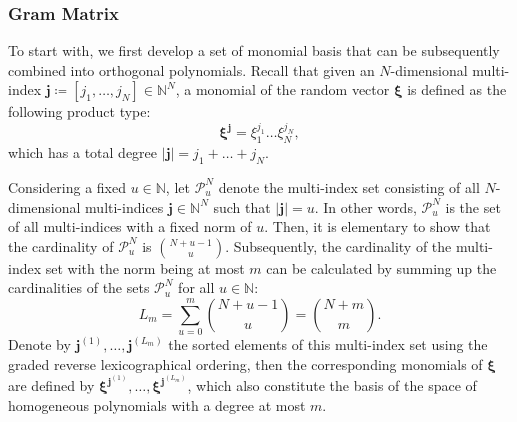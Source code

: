 \documentclass[journal]{IEEEtran}
\theoremstyle{definition}
\theoremstyle{remark}
\begin{document}
\subsubsection{Gram Matrix}
To start with, we first develop a set of monomial basis that can be subsequently combined into orthogonal polynomials.
Recall that given an $N$-dimensional multi-index $\boldsymbol{j}\coloneqq[j_1,\dots,j_N]\in\mathbb{N}^N$, a monomial of the random vector $\boldsymbol{\xi}$ is defined as the following product type:
\begin{equation}
    \boldsymbol{\xi}^{\boldsymbol{j}}=\xi_1^{j_1}\dots\xi_N^{j_N},
\end{equation}
which has a total degree $\vert\boldsymbol{j}\vert=j_1+\dots+j_N$.

Considering a fixed $u\in\mathbb{N}$, let $\mathcal{P}_u^N$ denote the multi-index set consisting of all $N$-dimensional multi-indices $\boldsymbol{j}\in\mathbb{N}^N$ such that $\vert\boldsymbol{j}\vert=u$. In other words, $\mathcal{P}_u^N$ is the set of all multi-indices with a fixed norm of $u$.
Then, it is elementary to show that the cardinality of $\mathcal{P}_u^N$ is $\binom{N+u-1}{u}$.
Subsequently, the cardinality of the multi-index set with the norm being at most $m$ can be calculated by summing up the cardinalities of the sets $\mathcal{P}_u^N$ for all $u\in\mathbb{N}$: 
\begin{equation}\label{eq:10}
    L_{m}=\sum\limits_{u=0}^m\binom{N+u-1}{u}=\binom{N+m}{m}.
\end{equation}
Denote by $\boldsymbol{j}^{(1)},\dots,\boldsymbol{j}^{(L_{m})}$ the sorted elements of this multi-index set using the graded reverse lexicographical ordering, then the corresponding monomials of $\boldsymbol{\xi}$ are defined by $\boldsymbol{\xi}^{\boldsymbol{j}^{(1)}},\dots,\boldsymbol{\xi}^{\boldsymbol{j}^{(L_{m})}}$, which also constitute the basis of the space of homogeneous polynomials with a degree at most $m$.
\end{document}
